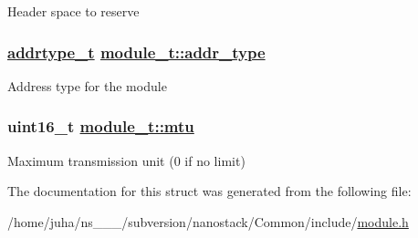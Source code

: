 Header space to reserve \hypertarget{structmodule__t_887ec8c859dcc146253dcd16afffda53}{
\subsubsection[addr\_\-type]{\setlength{\rightskip}{0pt plus 5cm}\hyperlink{address_8h_faf76b5591da0abd0584dec411d0551d}{addrtype\_\-t} \hyperlink{structmodule__t_887ec8c859dcc146253dcd16afffda53}{module\_\-t::addr\_\-type}}}
\label{structmodule__t_887ec8c859dcc146253dcd16afffda53}


Address type for the module \hypertarget{structmodule__t_f6fc529e7214ed8ba022da36b7e414a1}{
\subsubsection[mtu]{\setlength{\rightskip}{0pt plus 5cm}uint16\_\-t \hyperlink{structmodule__t_f6fc529e7214ed8ba022da36b7e414a1}{module\_\-t::mtu}}}
\label{structmodule__t_f6fc529e7214ed8ba022da36b7e414a1}


Maximum transmission unit (0 if no limit) 

The documentation for this struct was generated from the following file:\begin{CompactItemize}
\item 
/home/juha/ns\_\_\_/subversion/nanostack/Common/include/\hyperlink{module_8h}{module.h}\end{CompactItemize}

